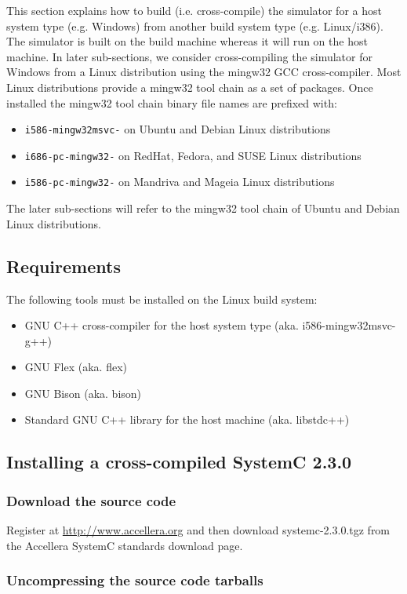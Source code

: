 This section explains how to build (i.e. cross-compile) the simulator for a host system type (e.g. Windows) from another build system type (e.g. Linux/i386).
The simulator is built on the build machine whereas it will run on the host machine.
In later sub-sections, we consider cross-compiling the simulator for Windows from a Linux distribution using the mingw32 GCC cross-compiler.
Most Linux distributions provide a mingw32 tool chain as a set of packages.
Once installed the mingw32 tool chain binary file names are prefixed with:
\begin{itemize}
\item \texttt{i586-mingw32msvc-} on Ubuntu and Debian Linux distributions
\item \texttt{i686-pc-mingw32-} on RedHat, Fedora, and SUSE Linux distributions
\item \texttt{i586-pc-mingw32-} on Mandriva and Mageia Linux distributions
\end{itemize}
The later sub-sections will refer to the mingw32 tool chain of Ubuntu and Debian Linux distributions.

\subsection{Requirements}

\noindent The following tools must be installed on the Linux build system:
\begin{itemize}
\item GNU C++ cross-compiler for the host system type (aka. i586-mingw32msvc-g++)
\item GNU Flex (aka. flex)
\item GNU Bison (aka. bison)
\item Standard GNU C++ library for the host machine (aka. libstdc++)
\end{itemize}

\subsection{Installing a cross-compiled SystemC 2.3.0}
\subsubsection{Download the source code}
Register at \url{http://www.accellera.org} and then download systemc-2.3.0.tgz from the Accellera SystemC standards download page.

\subsubsection{Uncompressing the source code tarballs}
  
